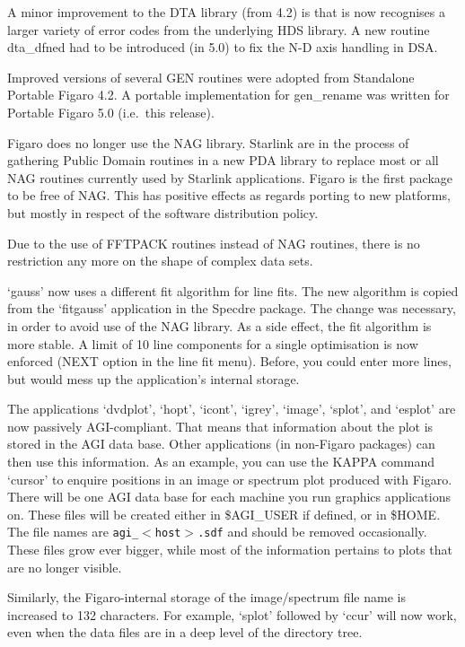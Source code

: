 \documentclass[11pt,twoside]{article}
\begin{document}
   A minor improvement to the DTA library (from 4.2) is that is now
   recognises a larger variety of error codes from the underlying HDS
   library. A new routine dta\_dfned had to be introduced (in 5.0) to fix
   the N-D axis handling in DSA.

   Improved versions of several GEN routines were adopted from
   Standalone Portable Figaro 4.2. A portable implementation for
   gen\_rename was written for Portable Figaro 5.0 (i.e.\ this release).


   Figaro does no longer use the NAG library. Starlink are in the
   process of gathering Public Domain routines in a new PDA library to
   replace most or all NAG routines currently used by Starlink
   applications. Figaro is the first package to be free of NAG. This has
   positive effects as regards porting to new platforms, but mostly in
   respect of the software distribution policy.

   Due to the use of FFTPACK routines instead of NAG routines, there is
   no restriction any more on the shape of complex data sets.

   `gauss' now uses a different fit algorithm for line fits. The new
   algorithm is copied from the `fitgauss' application in the Specdre
   package. The change was necessary, in order to avoid use of the NAG
   library. As a side effect, the fit algorithm is more stable. A
   limit of 10 line components for a single optimisation is now enforced
   (NEXT option in the line fit menu). Before, you could enter more
   lines, but would mess up the application's internal storage.


   The applications `dvdplot', `hopt', `icont', `igrey', `image',
   `splot', and `esplot' are now passively AGI-compliant. That means
   that information about the plot is stored in the AGI data
   base. Other applications (in non-Figaro packages) can then use this
   information. As an example, you can use the KAPPA command `cursor' to
   enquire positions in an image or spectrum plot produced with Figaro.
   There will be one AGI data base for each machine you run graphics
   applications on. These files will be created either in \$AGI\_USER if
   defined, or in \$HOME. The file names are {\tt agi\_$<$host$>$.sdf}
   and should be removed occasionally. These files grow ever bigger,
   while most of the information pertains to plots that are no longer
   visible.

   Similarly, the Figaro-internal storage of the image/spectrum file
   name is increased to 132 characters. For example, `splot' followed by
   `ccur' will now work, even when the data files are in a deep level of
   the directory tree.
\end{document}
